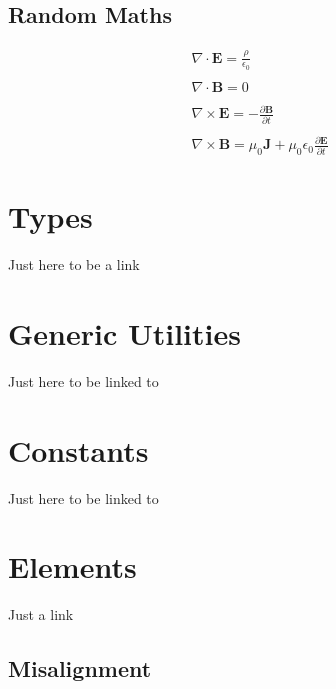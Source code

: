 \documentclass[letterpaper,10pt,english]{sphinxmanual}
\begin{document}
\section{Random Maths}
\label{\detokenize{sequences:random-maths}}\begin{equation*}
\begin{split}\nabla \cdot \textbf{E} = \frac{\rho}{\epsilon_0}\\\\
\nabla \cdot \textbf{B} = 0\\\\
\nabla \times \textbf{E} =- \frac{\partial \textbf{B}}{\partial t}\\\\
\nabla \times \textbf{B} = \mu_0 \textbf{J} + \mu_0 \epsilon_0 \frac{\partial \textbf{E}}{\partial t}\end{split}
\end{equation*}
\sphinxstepscope


\chapter{Types}
\label{\detokenize{types:types}}\label{\detokenize{types::doc}}
\sphinxAtStartPar
Just here to be a link

\sphinxstepscope


\chapter{Generic Utilities}
\label{\detokenize{utility:generic-utilities}}\label{\detokenize{utility::doc}}
\sphinxAtStartPar
Just here to be linked to

\sphinxstepscope


\chapter{Constants}
\label{\detokenize{constants:constants}}\label{\detokenize{constants::doc}}
\sphinxAtStartPar
Just here to be linked to

\sphinxstepscope


\chapter{Elements}
\label{\detokenize{elements:elements}}\label{\detokenize{elements::doc}}
\sphinxAtStartPar
Just a link


\section{Misalignment}
\label{\detokenize{elements:misalignment}}\label{\detokenize{elements:elm-misalign}}
\sphinxstepscope
\end{document}
